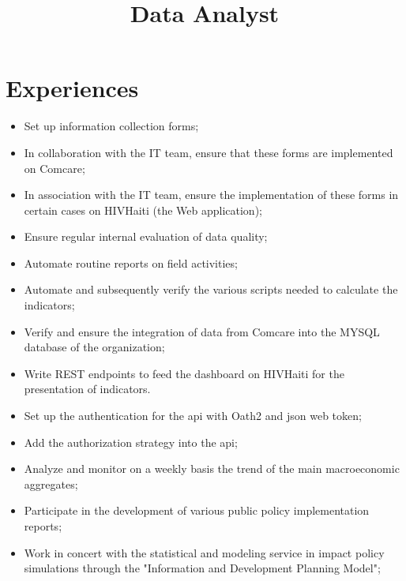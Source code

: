 \documentclass[11pt,a4paper]{moderncv}
\title{Data Analyst}
\begin{document}
\maketitle

\section{Experiences}
{
	\begin{itemize}%
		\item Set up information collection forms;
		\item In collaboration with the IT team, ensure that these forms are implemented on Comcare;
		\item In association with the IT team, ensure the implementation of these forms in certain cases on HIVHaiti (the Web application);
        \item Ensure regular internal evaluation of data quality;
		\item Automate routine reports on field activities;
		\item Automate and subsequently verify the various scripts needed to calculate the indicators;
		\item Verify and ensure the integration of data from Comcare into the MYSQL database of the organization;
		\item Write REST endpoints to feed the dashboard on HIVHaiti for the presentation of indicators.
	\end{itemize}
}
{
	\begin{itemize}%
		\item  Set up the authentication for the api with Oath2 and json web token;
		\item  Add the authorization strategy into the api;
	\end{itemize}
}
{
	\begin{itemize}%
		\item Analyze and monitor on a weekly basis the trend of the main macroeconomic aggregates;
		\item Participate in the development of various public policy implementation reports;
		\item Work in concert with the statistical and modeling service in impact policy simulations through the "Information and Development Planning Model";
	\end{itemize}
}
\end{document}
